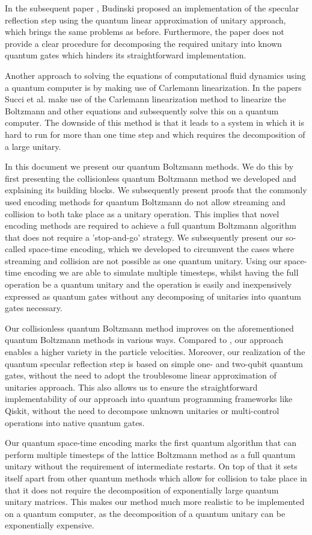 In the subsequent paper \cite{Budinski2021}, Budinski proposed an implementation of the specular reflection step using the quantum linear approximation of unitary approach, which brings the same problems as before. Furthermore, the paper does not provide a clear procedure for decomposing the required unitary into known quantum gates which hinders its straightforward implementation. 

Another approach to solving the equations of computational fluid dynamics using a quantum computer is by making use of Carlemann linearization. In the papers \cite{Itani2022, Itani2023a,Sanavio2023} Succi et al. make use of the Carlemann linearization method to linearize the Boltzmann and other equations and subsequently solve this on a quantum computer. The downside of this method is that it leads to a system in which it is hard to run for more than one time step and which requires the decomposition of a large unitary.  

In this document we present our quantum Boltzmann methods. We do this by first presenting the collisionless quantum Boltzmann method we developed and explaining its building blocks. We subsequently present proofs that the commonly used encoding methods for quantum Boltzmann do not allow streaming and collision to both take place as a unitary operation. This implies that novel encoding methods are required to achieve a full quantum Boltzmann algorithm that does not require a 'stop-and-go' strategy. We subsequently present our so-called space-time encoding, which we developed to circumvent the cases where streaming and collision are not possible as one quantum unitary. Using our space-time encoding we are able to simulate multiple timesteps, whilst having the full operation be a quantum unitary and the operation is easily and inexpensively expressed as quantum gates without any decomposing of unitaries into quantum gates necessary. 

Our collisionless quantum Boltzmann method improves on the aforementioned quantum Boltzmann methods in various ways. Compared to \cite{Budinski2020, Budinski2021}, our approach enables a higher variety in the particle velocities. Moreover, our realization of the quantum specular reflection step is based on simple one- and two-qubit quantum gates, without the need to adopt the troublesome linear approximation of unitaries approach. This also allows us to ensure the straightforward implementability of our approach into quantum programming frameworks like Qiskit, without the need to decompose unknown unitaries or multi-control operations into native quantum gates. 



Our quantum space-time encoding marks the first quantum algorithm that can perform multiple timesteps of the lattice Boltzmann method as a full quantum unitary without the requirement of intermediate restarts. On top of that it sets itself apart from other quantum methods which allow for collision to take place in that it does not require the decomposition of exponentially large quantum unitary matrices. This makes our method much more realistic to be implemented on a quantum computer, as the decomposition of a quantum unitary can be exponentially expensive. 